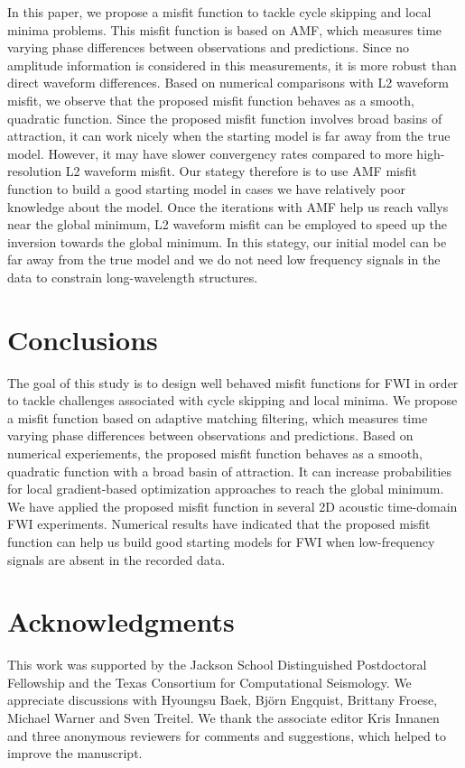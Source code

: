 In this paper, we propose a misfit function to tackle cycle skipping and 
local minima problems. This misfit function is based on AMF, which 
measures time varying phase differences between observations and predictions. 
Since no amplitude information is considered in this measurements, it is more 
robust than direct waveform differences. Based on numerical comparisons 
with L2 waveform misfit, we observe that the proposed misfit function behaves 
as a smooth, quadratic function. Since the proposed misfit function involves broad basins 
of attraction, it can work nicely when the starting model is far away from the true model. 
However, it may have slower convergency rates compared to more high-resolution L2 waveform misfit. 
Our stategy therefore is to use AMF misfit function to build a good starting model in cases 
we have relatively poor knowledge about the model. Once the iterations with AMF help us reach 
vallys near the global minimum, L2 waveform misfit can be employed to speed up the inversion 
towards the global minimum. In this stategy, our initial model can be far away from 
the true model and we do not need low frequency signals in the data to constrain 
long-wavelength structures.  

\section{Conclusions}
The goal of this study is to design well behaved misfit functions for FWI in order to tackle 
challenges associated with cycle skipping and local minima. We propose a misfit function based on 
adaptive matching filtering, which measures time varying phase differences between observations 
and predictions. Based on numerical experiements, the proposed misfit function behaves as 
a smooth, quadratic function with a broad basin of attraction. It can increase probabilities 
for local gradient-based optimization approaches to reach the global minimum. 
We have applied the proposed misfit function in several 2D acoustic time-domain FWI experiments. 
Numerical results have indicated that the proposed misfit function can help us build good 
starting models for FWI when low-frequency signals are absent in the recorded data.

\section{Acknowledgments}
This work was supported by the Jackson School Distinguished Postdoctoral Fellowship and the 
Texas Consortium for Computational Seismology. 
We appreciate discussions with Hyoungsu Baek, Bj\"{o}rn Engquist, Brittany Froese, Michael Warner and Sven Treitel. 
We thank the associate editor Kris Innanen and three anonymous reviewers for comments and suggestions, which helped 
to improve the manuscript.




